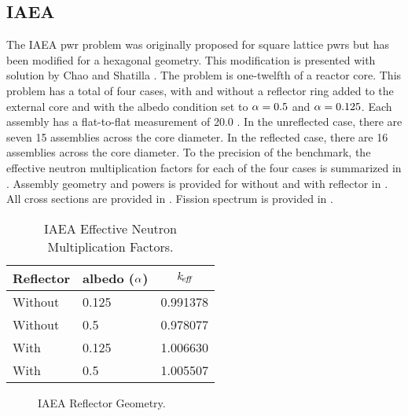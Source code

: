   \subsection{IAEA}
    \label{sec:iaea}
    The IAEA \gls{pwr} problem was originally proposed for square lattice
    \glspl{pwr} but has been modified for a hexagonal geometry. This 
    modification is presented with solution by Chao and Shatilla \cite{chao}. 
    The problem is one-twelfth of a 
    reactor core. This problem has a total of four cases, with and without a 
    reflector ring added to the external core and with the albedo condition set 
    to $\alpha = 0.5$ and $\alpha = 0.125$. Each assembly has a flat-to-flat
    measurement of 20.0 . In the unreflected case, there are seven
    15 assemblies across the core diameter. In the reflected case, there are 16
    assemblies across the core diameter. To the precision of the benchmark, the
    effective neutron multiplication factors for each of the four cases is 
    summarized in .
    Assembly geometry and powers is provided for without and with 
    reflector in . All cross sections are provided in 
    . Fission spectrum is provided in .

    \begin{table}
      \caption{IAEA Effective Neutron Multiplication Factors.}
      \label{tab:iaeakeff}
      \begin{center}
        \begin{tabular}{llc}
          \toprule
          Reflector & albedo ($\alpha$) & $k_{\!\mbox{\scriptsize \em eff}}$ \\
          \midrule
          Without & 0.125 & 0.991378 \\
          Without & 0.5   & 0.978077 \\
          With    & 0.125 & 1.006630 \\
          With    & 0.5   & 1.005507 \\
          \bottomrule
        \end{tabular}
      \end{center}
    \end{table}

    \begin{figure}
      \centering
      \vspace{0.2in}
      \caption{IAEA Reflector Geometry.}
      \label{fig:iaea_geom}
    \end{figure}


